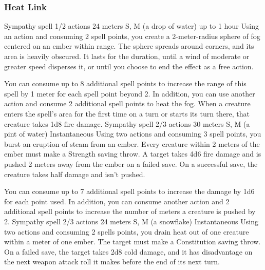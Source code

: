 \subsubsection{Heat Link}
        {Sympathy spell}
        {1/2 actions}
        {24 meters}
        {S, M (a drop of water)}
        {up to 1 hour}
        Using an action and consuming 2 spell points, you create a 2-meter-radius sphere of fog centered on an ember within range.
        The sphere spreads around corners, and its area is heavily obscured.
        It lasts for the duration, until a wind of moderate or greater speed disperses it, or until you choose to end the effect as a free action.

        You can consume up to 8 additional spell points to increase the range of this spell by 1 meter for each spell point beyond 2.
        In addition, you can use another action and consume 2 additional spell points to heat the fog.
        When a creature enters the spell's area for the first time on a turn or starts its turn there, that creature takes 1d8 fire damage.
        {Sympathy spell}
        {2/3 actions}
        {30 meters}
        {S, M (a pint of water)}
        {Instantaneous}
        Using two actions and consuming 3 spell points, you burst an eruption of steam from an ember.
        Every creature within 2 meters of the ember must make a Strength saving throw.
        A target takes 4d6 fire damage and is pushed 2 meters away from the ember on a failed save.
        On a successful save, the creature takes half damage and isn't pushed.

        You can consume up to 7 additional spell points to increase the damage by 1d6 for each point used.
        In addition, you can consume another action and 2 additional spell points to increase the number of meters a creature is pushed by 2.
        {Sympathy spell}
        {2/3 actions}
        {24 meters}
        {S, M (a snowflake)}
        {Instantaneous}
        Using two actions and consuming 2 spells points, you drain heat out of one creature within a meter of one ember.
        The target must make a Constitution saving throw.
        On a failed save, the target takes 2d8 cold damage, and it has disadvantage on the next weapon attack roll it makes before the end of its next turn.

